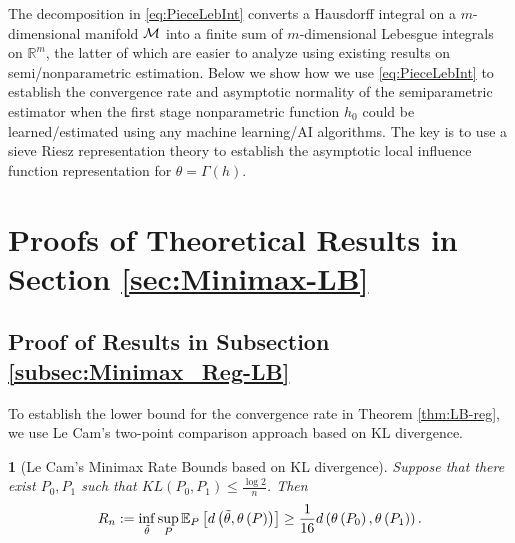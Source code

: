 \documentclass[12pt,american]{article}
\theoremstyle{definition}
\theoremstyle{plain}
\theoremstyle{definition}
\theoremstyle{plain}
\newtheorem{lem}{\protect\lemmaname}
\theoremstyle{plain}
\theoremstyle{plain}
\theoremstyle{plain}
\theoremstyle{plain}
\newcommand{\R}{\mathbb{R}}
\newcommand{\E}{\mathbb{E}}
\providecommand{\lemmaname}{Lemma}
\providecommand{\lemmaname}{Lemma}
\begin{document}
The decomposition in \eqref{eq:PieceLebInt} converts a Hausdorff
integral on a $m$-dimensional manifold ${\cal M}$ into a finite sum of $m$-dimensional Lebesgue integrals on $\R^m$,
the latter of which are easier to analyze using existing results on
semi/nonparametric estimation.
Below we show how we use \eqref{eq:PieceLebInt}
to establish the convergence rate and asymptotic normality of the
semiparametric estimator when the first stage nonparametric function $h_0$  could be learned/estimated using any machine learning/AI algorithms. The key is to use a sieve Riesz representation theory to establish the asymptotic local influence function representation for $\theta=\Gamma (h)$.

\section{\label{sec:MainProofs-LB}Proofs of Theoretical Results in Section \ref{sec:Minimax-LB}}

\subsection{Proof of Results in Subsection \ref{subsec:Minimax_Reg-LB}}

To establish the lower bound for the convergence rate in Theorem \ref{thm:LB-reg}, we use Le Cam's two-point comparison approach based on KL divergence.
\begin{lem}[Le Cam's Minimax Rate Bounds based on KL divergence]\label{lem:LeCam}
 Suppose that there exist $P_{0},P_{1}$ such that $KL\left(P_{0},P_{1}\right)\leq\frac{\log2}{n}$.
Then
\[
R_{n}:=\inf_{\tilde{\t}}\sup_{P}\E_{P}\left[d\left(\tilde{\t},\t\left(P\right)\right)\right]\geq\frac{1}{16}d\left(\t\left(P_{0}\right),\t\left(P_{1}\right)\right).
\]
\end{lem}
\end{document}
